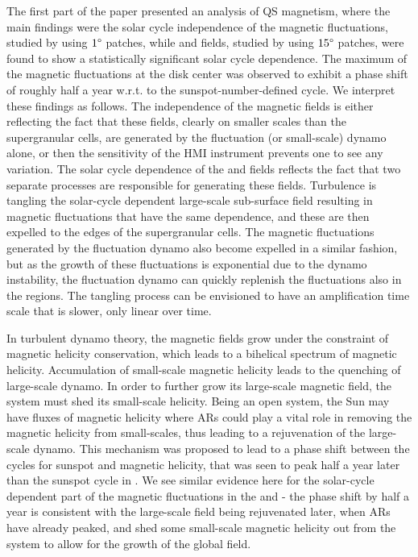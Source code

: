\documentclass{aa}
\begin{document}
The first part of the paper presented an analysis of QS magnetism, where the main findings were the solar cycle independence of the \IN{} magnetic fluctuations, studied by using $1\degree$ patches, while \NW{} and \IN{} fields, studied by using $15 \degree$ patches, were found to show a statistically significant solar cycle dependence. The maximum of the magnetic fluctuations at the disk center was observed to exhibit a phase shift of roughly half a year w.r.t. to the sunspot-number-defined cycle. We interpret these findings as follows. The independence of the \IN{} magnetic fields is either reflecting the fact that these fields, clearly on smaller scales than the supergranular cells, are generated by the fluctuation (or small-scale) dynamo alone, or then the sensitivity of the HMI instrument prevents one to see any variation. The solar cycle dependence of the \NW{} and \IN{} fields reflects the fact that two separate processes are responsible for generating these fields. Turbulence is tangling the solar-cycle dependent large-scale sub-surface field resulting in magnetic fluctuations that have the same dependence, and these are then expelled to the edges of the supergranular cells. The magnetic fluctuations generated by the fluctuation dynamo also become expelled in a similar fashion, but as the growth of these fluctuations is exponential due to the dynamo instability, the fluctuation dynamo can quickly replenish the fluctuations also in the \IN{} regions. The tangling process can be envisioned to have an amplification time scale that is slower, only linear over time.

In turbulent dynamo theory, the magnetic fields grow under the constraint of magnetic helicity
conservation, which leads to a bihelical spectrum of magnetic helicity. Accumulation of small-scale
magnetic helicity leads to the quenching of large-scale dynamo. In order to further grow its large-scale
magnetic field, the system must shed its small-scale helicity. Being an open system, the Sun
may have fluxes of magnetic helicity where ARs could play a vital role in removing the magnetic
helicity from small-scales, thus leading to a rejuvenation of
the
large-scale dynamo. This mechanism was proposed to lead to a phase shift 
between the cycles for sunspot and magnetic helicity,
that was seen to peak half a year later than the sunspot cycle in \cite{S+18}. We see similar evidence here for the solar-cycle dependent part of the magnetic fluctuations in the \NW{} and \IN{} - the phase shift by half a year is consistent with the large-scale field being rejuvenated later, when ARs have already peaked, and shed some small-scale magnetic helicity out from the system to allow for the growth of the global field.
\end{document}
